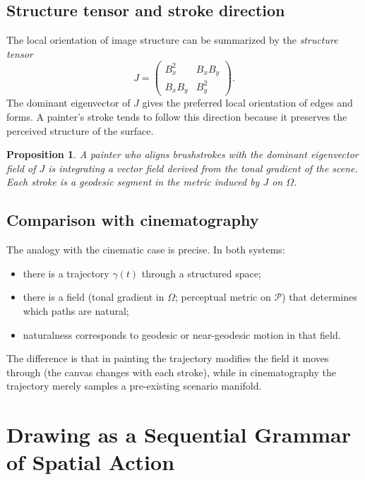 \documentclass[12pt,a4paper]{article}
\theoremstyle{plain}
\newtheorem{proposition}[theorem]{Proposition}
\theoremstyle{definition}
\begin{document}
\subsection{Structure tensor and stroke direction}

The local orientation of image structure can be summarized by the
\emph{structure tensor}
\[
J = \begin{pmatrix} B_x^2 & B_x B_y \\ B_x B_y & B_y^2 \end{pmatrix}.
\]
The dominant eigenvector of $J$ gives the preferred local orientation of edges
and forms. A painter's stroke tends to follow this direction because it preserves
the perceived structure of the surface.

\begin{proposition}
A painter who aligns brushstrokes with the dominant eigenvector field of $J$
is integrating a vector field derived from the tonal gradient of the scene.
Each stroke is a geodesic segment in the metric induced by $J$ on $\Omega$.
\end{proposition}

\subsection{Comparison with cinematography}

The analogy with the cinematic case is precise. In both systems:
\begin{itemize}[nosep]
\item there is a trajectory $\gamma(t)$ through a structured space;
\item there is a field (tonal gradient in $\Omega$; perceptual metric on
$\mathcal{P}$) that determines which paths are natural;
\item naturalness corresponds to geodesic or near-geodesic motion in that field.
\end{itemize}
The difference is that in painting the trajectory modifies the field it moves
through (the canvas changes with each stroke), while in cinematography the
trajectory merely samples a pre-existing scenario manifold.

\section{Drawing as a Sequential Grammar of Spatial Action}
\label{sec:drawing}
\end{document}

